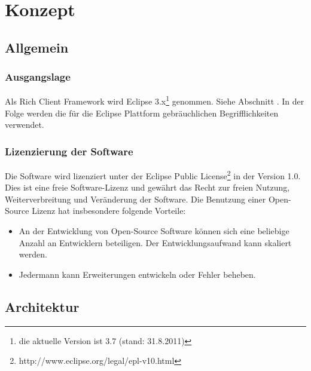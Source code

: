 \chapter{Konzept}\label{konzept}
\section{Allgemein}
\subsection{Ausgangslage}
Als Rich Client Framework wird Eclipse 3.x\footnote{die aktuelle Version ist 3.7 (stand: 31.8.2011)} genommen. Siehe Abschnitt . In der Folge werden die für die Eclipse Plattform gebräuchlichen Begrifflichkeiten verwendet. 

\subsection{Lizenzierung der Software}
Die Software wird lizenziert unter der Eclipse Public License\footnote{http://www.eclipse.org/legal/epl-v10.html} in der Version 1.0. Dies ist eine freie Software-Lizenz und gewährt das Recht zur freien Nutzung, Weiterverbreitung und Veränderung der Software. Die Benutzung einer Open-Source Lizenz hat insbesondere folgende Vorteile:
\begin{itemize}
	\item An der Entwicklung von Open-Source Software können sich eine beliebige Anzahl an Entwicklern beteiligen. Der Entwicklungsaufwand kann skaliert werden.
	\item Jedermann kann Erweiterungen entwickeln oder Fehler beheben.
\end{itemize}

\section{Architektur}
